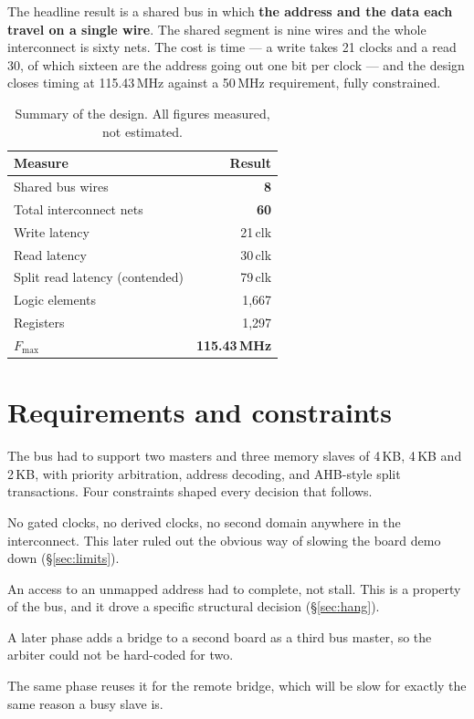 \documentclass[11pt,a4paper]{article}
\begin{document}
The headline result is a shared bus in which \textbf{the address and the data
each travel on a single wire}. The shared segment is nine wires and the whole
interconnect is sixty nets. The cost is time --- a write takes 21 clocks and a
read 30, of which sixteen are the address going out one bit per clock --- and
the design closes timing at 115.43\,MHz against a 50\,MHz requirement, fully
constrained.

\begin{table}[htb]
\centering\small
\caption{Summary of the design. All figures measured, not estimated.}
\begin{tabular}{@{}lr@{}}
\toprule
\textbf{Measure} & \textbf{Result}\\
\midrule
Shared bus wires        & \textbf{8}\\
Total interconnect nets & \textbf{60}\\
Write latency           & 21\,clk\\
Read latency            & 30\,clk\\
Split read latency (contended) & 79\,clk\\
Logic elements          & 1{,}667\\
Registers               & 1{,}297\\
$F_{\max}$              & \textbf{115.43\,MHz}\\
\bottomrule
\end{tabular}
\end{table}

\section{Requirements and constraints}

The bus had to support two masters and three memory slaves of 4\,KB, 4\,KB
and 2\,KB, with priority arbitration, address decoding, and AHB-style split
transactions. Four constraints shaped every decision that follows.

\begin{description}[leftmargin=1.4em,style=nextline,font=\bfseries]
\item[One clock domain, one asynchronous reset.]
No gated clocks, no derived clocks, no second domain anywhere in the
interconnect. This later ruled out the obvious way of slowing the board demo
down (\S\ref{sec:limits}).

\item[The bus must never hang.]
An access to an unmapped address had to complete, not stall. This is a
property of the bus, and it drove a specific structural decision
(\S\ref{sec:hang}).

\item[Parameterised for three requesters.]
A later phase adds a bridge to a second board as a third bus master, so the
arbiter could not be hard-coded for two.

\item[The split mechanism written once.]
The same phase reuses it for the remote bridge, which will be slow for
exactly the same reason a busy slave is.
\end{description}
\end{document}
